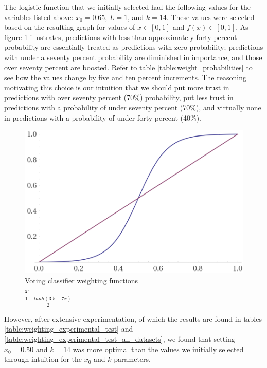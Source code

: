 The logistic function that we initially selected had the following values for the variables listed above: $x_0=0.65$, $L=1$, and $k=14$. These values were selected based on the resulting graph for values of $x \in [0, 1]$ and $f(x) \in [0, 1]$. As figure \ref{graph:weights} illustrates, predictions with less than approximately forty percent probability are essentially treated as predictions with zero probability; predictions with under a seventy percent probability are diminished in importance, and those over seventy percent are boosted. Refer to table \ref{table:weight_probabilities} to see how the values change by five and ten percent increments. The reasoning motivating this choice is our intuition that we should put more trust in predictions with over seventy percent (70\%) probability, put less trust in predictions with a probability of under seventy percent  (70\%), and virtually none in predictions with a probability of under forty percent (40\%).

\begin{figure}
  \includegraphics[width=\linewidth]{./images/chapter3/weight_graph}
\caption{\label{graph:weights}Voting classifier weighting functions\\\protect\blueline$x$\\
\protect\redline $\frac{1-tanh(3.5-7x)}{2}$}
\end{figure}

However, after extensive experimentation, of which the results are found in tables \ref{table:weighting_experimental_test} and \ref{table:weighting_experimental_test_all_datasets}, we found that setting \textbf{$x_0=0.50$} and \textbf{$k=14$} was more optimal than the values we initially selected through intuition for the $x_0$ and $k$ parameters.

